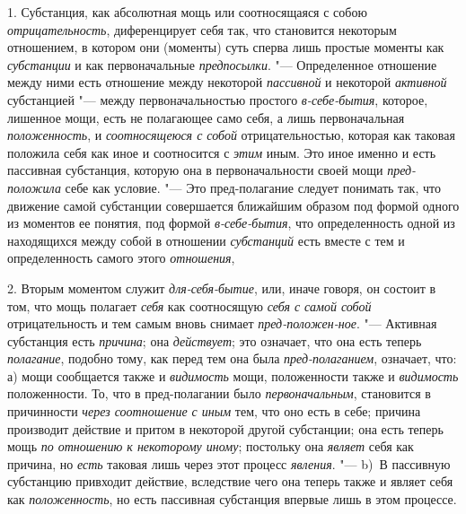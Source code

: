 1. Субстанция, как абсолютная мощь или соотносящаяся с собою {\em отрицательность},
диференцирует себя так, что становится некоторым отношением,
в котором они (моменты) суть сперва лишь простые моменты как
{\em субстанции} и как первоначальные {\em предпосылки}. "---
Определенное отношение между ними есть отношение между некоторой {\em пассивной}
и некоторой {\em активной} субстанцией "--- между первоначальностью простого
{\em в-себе-бытия}, которое, лишенное мощи, есть не полагающее само себя,
а лишь первоначальная {\em положенность}, и {\em соотносящеюся с собой}
отрицательностью, которая как таковая положила себя как иное и соотносится с
{\em этим} иным. Это иное именно и есть пассивная субстанция, которую она в
первоначальности своей мощи {\em пред-положила} себе как условие. "--- Это
пред-полагание следует понимать так, что движение самой субстанции
совершается ближайшим образом под формой одного из моментов ее понятия, под
формой {\em в-себе-бытия}, что определенность одной из находящихся между
собой в отношении {\em субстанций} есть вместе с тем и определенность самого
этого {\em отношения},

2. Вторым моментом служит {\em для-себя-бытие}, или, иначе говоря, он
состоит в том, что мощь полагает {\em себя} как соотносящую {\em себя с
самой собой} отрицательность и тем самым вновь снимает
{\em пред-положен-ное}. "--- Активная субстанция есть {\em причина}; она
{\em действует}; это означает, что она есть теперь {\em полагание}, подобно
тому, как перед тем она была {\em пред-полаганием}, означает, что: а) мощи
сообщается также и {\em видимость} мощи, положенности также и {\em видимость}
положенности. То, что в пред-полагании было {\em первоначальным}, становится
в причинности {\em через соотношение с иным} тем, что оно есть в себе;
причина производит действие и притом в некоторой другой субстанции; она есть
теперь мощь {\em по отношению к некоторому иному}; постольку она {\em являет}
себя как причина, но {\em есть} таковая лишь через этот процесс {\em явления}.
"--- b)~В пассивную субстанцию привходит действие, вследствие чего она теперь
также и являет себя как {\em положенность}, но есть пассивная субстанция
впервые лишь в этом процессе.

